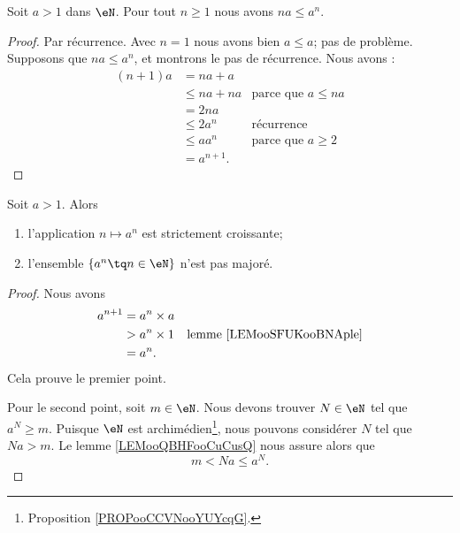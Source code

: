 \begin{lemma}       \label{LEMooIETGooMyrilW}
	Soit \( a>1\) dans \( \eN\). Pour tout \( n\geq 1\) nous avons \( na\leq a^n\).
\end{lemma}

\begin{proof}
	Par récurrence. Avec \( n=1\) nous avons bien \( a\leq a\); pas de problème. Supposons que \( na\leq a^n\), et montrons le pas de récurrence. Nous avons :
	\begin{subequations}
		\begin{align}
			(n+1)a & =   na+a                                   \\
			       & \leq  na+na  & \text{parce que }  a\leq na \\
			       & =   2na                                    \\
			       & \leq  2a^n   & \text{récurrence}           \\
			       & \leq  aa^n   & \text{parce que } a\geq 2   \\
			       & =   a^{n+1}.
		\end{align}
	\end{subequations}
\end{proof}

\begin{proposition}	\label{PROPooSuiteGeometriqueCroissante}
	Soit \( a>1\). Alors
	\begin{enumerate}
		\item
		      l'application \( n\mapsto a^n\) est strictement croissante;
		\item
		      l'ensemble \( \{ a^n\tq n\in \eN \}\) n'est pas majoré.
	\end{enumerate}
\end{proposition}

\begin{proof}
	Nous avons
	\begin{subequations}
		\begin{align}
			a^{n+1} & =a^n\times a                                        \\
			        & >a^n\times 1 & \text{lemme \ref{LEMooSFUKooBNAple}} \\
			        & =a^n.
		\end{align}
	\end{subequations}
	Cela prouve le premier point.

	Pour le second point, soit \( m\in \eN\). Nous devons trouver \( N\in \eN\) tel que \( a^N\geq m\). Puisque \( \eN\) est archimédien\footnote{Proposition \ref{PROPooCCVNooYUYcqG}.}, nous pouvons considérer \( N\) tel que \( Na>m\). Le lemme \ref{LEMooQBHFooCuCusQ} nous assure alors que
	\begin{equation}
		m<Na\leq a^N.
	\end{equation}
\end{proof}

